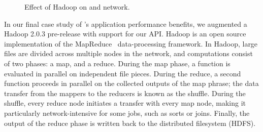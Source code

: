 \begin{figure}[t]
\centering
{}
\caption{Effect of Hadoop on \sys and network.}
\label{fig:HadoopResvs}
\end{figure}

In our final case study of \sys's application performance benefits, we augmented
a Hadoop 2.0.3 pre-release with support for our API. Hadoop is an open source
implementation of the MapReduce~\cite{Dean:2008} data-processing framework.
In Hadoop, large files are divided across multiple nodes in the network, and
computations consist of two phases: a map, and a reduce. During the
map phase, a function is evaluated in parallel on independent file pieces.
During the reduce, a second function proceeds in parallel on the collected outputs
of the map phrase; the data transfer from the mappers to the reducers is
known as the shuffle. During the shuffle, every reduce node initiates a
transfer with every map node, making it particularly network-intensive for
some jobs, such as sorts or joins.
Finally, the output of the reduce phase is written back to
the distributed filesystem (HDFS).


